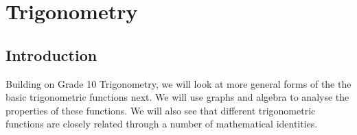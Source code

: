 \chapter{Trigonometry}
\label{m:t11}

\section{Introduction}
\label{mt:h}

%

Building on Grade 10 Trigonometry, we will look at more general forms
of the the basic trigonometric functions next. We will use graphs and
algebra to analyse the properties of these functions. We will also see
that different trigonometric functions are closely related through a
number of mathematical identities.

